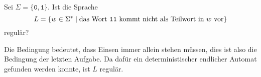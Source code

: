 Sei $\Sigma=\{\texttt{0},\texttt{1}\}$.
Ist die Sprache
\[
L
=
\{
w\in \Sigma^*
\mid
\text{das Wort \texttt{11} kommt nicht als Teilwort in $w$ vor}
\}
\]
regulär?

\begin{loesung}
Die Bedingung bedeutet, dass Einsen immer allein stehen müssen, 
dies ist also die Bedingung der letzten Aufgabe.
Da dafür ein deterministischer endlicher Automat gefunden werden 
konnte, ist $L$ regulär.
\end{loesung}
